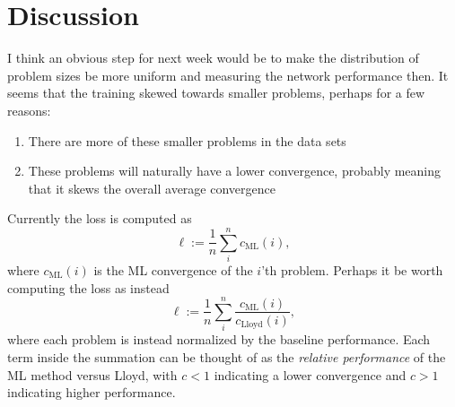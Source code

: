 \documentclass{article}
\begin{document}
\section{Discussion}
I think an obvious step for next week would be to make the distribution of problem sizes be more uniform and measuring the network performance then.  It seems that the training skewed towards smaller problems, perhaps for a few reasons:
\begin{enumerate}
\item There are more of these smaller problems in the data sets
\item These problems will naturally have a lower convergence, probably meaning that it skews the overall average convergence
\end{enumerate}

Currently the loss is computed as
\begin{equation}
  \ell := \frac{1}{n} \sum_i^n c_{\text{ML}}\left(i\right),
\end{equation}
where $c_{\text{ML}}\left(i\right)$ is the ML convergence of the $i$'th problem.  Perhaps it be worth computing the loss as instead
\begin{equation}
  \ell := \frac{1}{n} \sum_i^n \frac{c_{\text{ML}}\left(i\right)}{c_{\text{Lloyd}}\left(i\right)},
\end{equation}
where each problem is instead normalized by the baseline performance.  Each term inside the summation can be thought of as the \textit{relative performance} of the ML method versus Lloyd, with $c<1$ indicating a lower convergence and $c>1$ indicating higher performance.



\end{document}

